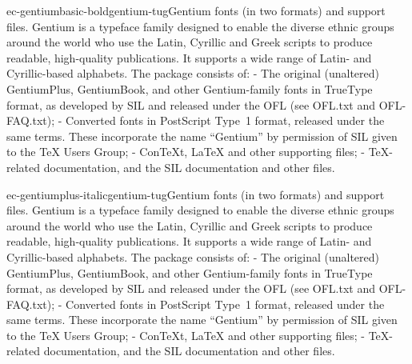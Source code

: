 \documentclass{ddltxtyp}
\begin{document}
\begin{package}{ec-gentiumbasic-bold}{gentium-tug}{Gentium fonts (in two formats) and support files.}
Gentium is a typeface family designed to enable the diverse
ethnic groups around the world who use the Latin, Cyrillic and
Greek scripts to produce readable, high-quality publications.
It supports a wide range of Latin- and Cyrillic-based
alphabets. The package consists of: - The original (unaltered)
GentiumPlus, GentiumBook, and other Gentium-family fonts in
TrueType format, as developed by SIL and released under the OFL
(see OFL.txt and OFL-FAQ.txt); - Converted fonts in PostScript
Type~1 format, released under the same terms. These incorporate
the name ``Gentium'' by permission of SIL given to the {\TeX} Users
Group; - ConTeXt, {\LaTeX} and other supporting files; - {\TeX}-
related documentation, and the SIL documentation and other
files.
\end{package}
\begin{package}{ec-gentiumplus-italic}{gentium-tug}{Gentium fonts (in two formats) and support files.}
Gentium is a typeface family designed to enable the diverse
ethnic groups around the world who use the Latin, Cyrillic and
Greek scripts to produce readable, high-quality publications.
It supports a wide range of Latin- and Cyrillic-based
alphabets. The package consists of: - The original (unaltered)
GentiumPlus, GentiumBook, and other Gentium-family fonts in
TrueType format, as developed by SIL and released under the OFL
(see OFL.txt and OFL-FAQ.txt); - Converted fonts in PostScript
Type~1 format, released under the same terms. These incorporate
the name ``Gentium'' by permission of SIL given to the {\TeX} Users
Group; - ConTeXt, {\LaTeX} and other supporting files; - {\TeX}-
related documentation, and the SIL documentation and other
files.
\end{package}
\end{document}
